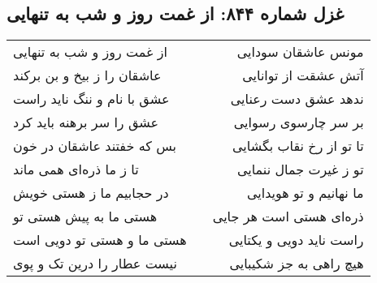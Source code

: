 \begin{center}
\section*{غزل شماره ۸۴۴: از غمت روز و شب به تنهایی}
\label{sec:844}
\begin{longtable}{l p{0.5cm} r}
از غمت روز و شب به تنهایی
&&
مونس عاشقان سودایی
\\
عاشقان را ز بیخ و بن برکند
&&
آتش عشقت از توانایی
\\
عشق با نام و ننگ ناید راست
&&
ندهد عشق دست رعنایی
\\
عشق را سر برهنه باید کرد
&&
بر سر چارسوی رسوایی
\\
بس که خفتند عاشقان در خون
&&
تا تو از رخ نقاب بگشایی
\\
تا ز ما ذره‌ای همی ماند
&&
تو ز غیرت جمال ننمایی
\\
در حجابیم ما ز هستی خویش
&&
ما نهانیم و تو هویدایی
\\
هستی ما به پیش هستی تو
&&
ذره‌ای هستی است هر جایی
\\
هستی ما و هستی تو دویی است
&&
راست ناید دویی و یکتایی
\\
نیست عطار را درین تک و پوی
&&
هیچ راهی به جز شکیبایی
\\
\end{longtable}
\end{center}
